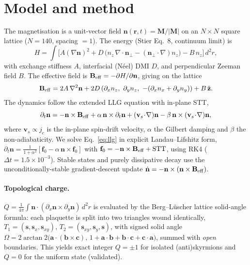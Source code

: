 \documentclass[11pt]{article}
\begin{document}
\section{Model and method}
The magnetisation is a unit-vector field $\mathbf n(\mathbf r,t)=\mathbf
M/|\mathbf M|$ on an $N\times N$ square lattice ($N=140$, spacing $=1$). The
energy (Stier Eq.~8, continuum limit) is
\begin{equation}
H = \int \Big[ A(\nabla\mathbf n)^2
   + D\,\big(n_z\,\nabla\!\cdot\!\mathbf n_\perp - (\mathbf n_\perp\!\cdot\!\nabla)n_z\big)
   - B\,n_z \Big]\,d^2r ,
\end{equation}
with exchange stiffness $A$, interfacial (N\'eel) DMI $D$, and perpendicular
Zeeman field $B$. The effective field is $\mathbf B_{\rm eff}=-\partial
H/\partial\mathbf n$, giving on the lattice
\begin{equation}
\mathbf B_{\rm eff}=2A\,\nabla^2\mathbf n
 + 2D\,(\partial_x n_z,\ \partial_y n_z,\ -(\partial_x n_x+\partial_y n_y))
 + B\,\hat{\mathbf z}.
\end{equation}
The dynamics follow the extended LLG equation with in-plane STT,
\begin{equation}
\partial_t\mathbf n = -\mathbf n\times\mathbf B_{\rm eff}
 + \alpha\,\mathbf n\times\partial_t\mathbf n
 + (\mathbf v_s\!\cdot\!\nabla)\mathbf n
 - \beta\,\mathbf n\times(\mathbf v_s\!\cdot\!\nabla)\mathbf n ,
\label{eq:llg}
\end{equation}
where $\mathbf v_s\propto j_c$ is the in-plane spin-drift velocity, $\alpha$
the Gilbert damping and $\beta$ the non-adiabaticity. We solve
Eq.~\eqref{eq:llg} in explicit Landau--Lifshitz form,
$\partial_t\mathbf n=\tfrac{1}{1+\alpha^2}[\mathbf f_0-\alpha\,\mathbf
n\times\mathbf f_0]$ with $\mathbf f_0=-\mathbf n\times\mathbf B_{\rm
eff}+\mathrm{STT}$, using RK4 ($\Delta t=1.5\times10^{-3}$). Stable states and
purely dissipative decay use the unconditionally-stable gradient-descent update
$\dot{\mathbf n}=-\mathbf n\times(\mathbf n\times\mathbf B_{\rm eff})$.

\paragraph{Topological charge.}
$Q=\tfrac1{4\pi}\int\mathbf n\!\cdot\!(\partial_x\mathbf n\times\partial_y
\mathbf n)\,d^2r$ is evaluated by the Berg--L\"uscher lattice solid-angle
formula: each plaquette is split into two triangles wound identically,
$T_1=(\mathbf s,\mathbf s_x,\mathbf s_{xy})$, $T_2=(\mathbf s_{xy},\mathbf
s_y,\mathbf s)$, with signed solid angle
$\Omega=2\arctan2\!\big(\mathbf a\!\cdot\!(\mathbf b\times\mathbf c),\,
1+\mathbf a\!\cdot\!\mathbf b+\mathbf b\!\cdot\!\mathbf c+\mathbf c\!\cdot\!
\mathbf a\big)$, summed with \emph{open} boundaries. This yields exact integer
$Q=\pm1$ for isolated (anti)skyrmions and $Q=0$ for the uniform state
(validated).
\end{document}
